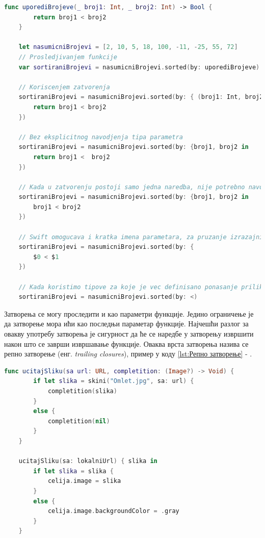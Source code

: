 \documentclass[12pt,oneside]{memoir}
\begin{document}
\begin{lstlisting}[caption=\textit{{Израз затворења за сортирање}}, label={lst:Израз затворења за сортирање}, language=Swift, frame=single]
    func uporediBrojeve(_ broj1: Int, _ broj2: Int) -> Bool {
        return broj1 < broj2
    }
    
    let nasumicniBrojevi = [2, 10, 5, 18, 100, -11, -25, 55, 72]
    // Prosledjivanjem funkcije
    var sortiraniBrojevi = nasumicniBrojevi.sorted(by: uporediBrojeve)
    
    // Koriscenjem zatvorenja
    sortiraniBrojevi = nasumicniBrojevi.sorted(by: { (broj1: Int, broj2: Int) -> Bool in
        return broj1 < broj2
    })
    
    // Bez eksplicitnog navodjenja tipa parametra
    sortiraniBrojevi = nasumicniBrojevi.sorted(by: {broj1, broj2 in 
        return broj1 <  broj2
    })
    
    // Kada u zatvorenju postoji samo jedna naredba, nije potrebno navodjenje kljucne reci 'return', povratna vrednost bice vrednost izvrsenja te naredbe
    sortiraniBrojevi = nasumicniBrojevi.sorted(by: {broj1, broj2 in 
        broj1 < broj2
    })
    
    // Swift omogucava i kratka imena parametara, za pruzanje izrazajnije sintakse
    sortiraniBrojevi = nasumicniBrojevi.sorted(by: { 
        $0 < $1
    })
    
    // Kada koristimo tipove za koje je vec definisano ponasanje prilikom poredjenja, mozemo proslediti samo kako zelimo da sortiramo clanove niza
    sortiraniBrojevi = nasumicniBrojevi.sorted(by: <)
\end{lstlisting}

\indent Затворења се могу проследити и као параметри функције. Једино ограничење је да затворење мора ићи као последњи параметар функције. Најчешћи разлог за овакву употребу затворења је сигурност да ће се наредбе у затворењу извршити након што се заврши извршавање функције. Оваква врста затворења назива се репно затворење (енг. \textit{trailing closures}), пример у коду \ref{lst:Репно затворење} - .

\begin{lstlisting}[caption=\textit{{Репно затворење}}, label={lst:Репно затворење}, language=Swift, frame=single]
    func ucitajSliku(sa url: URL, completition: (Image?) -> Void) {
        if let slika = skini("Omlet.jpg", sa: url) {
            completition(slika)
        }
        else {
            completition(nil)
        }
    }
    
    ucitajSliku(sa: lokalniUrl) { slika in
        if let slika = slika {
            celija.image = slika
        }
        else {
            celija.image.backgroundColor = .gray
        }
    }
\end{lstlisting}
\end{document}
